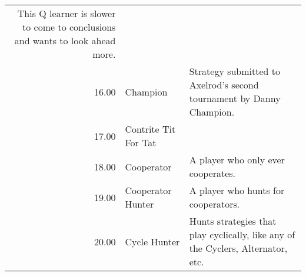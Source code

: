 \begin{table}[!hbtp]
\begin{adjustbox}{width=2\textwidth, angle=90}
\begin{tabular}{rll}
	This Q learner is slower to come to conclusions and wants to look ahead more.                                                                                                                                                                                                                                                                                                                                                                                                                                                                                                                                                                                                                                                                                                                                                                                                                                                             \\
	16.00  & Champion                    & Strategy submitted to Axelrod's second tournament by Danny Champion.                                                              \\
	17.00  & Contrite Tit For Tat        &                                                                                                                                   \\
	18.00  & Cooperator                  & A player who only ever cooperates.                                                                                                \\
	19.00  & Cooperator Hunter           & A player who hunts for cooperators.                                                                                               \\
	20.00  & Cycle Hunter                & Hunts strategies that play cyclically, like any of the Cyclers,
	                                       Alternator, etc.                                                                                                                                                                                                                                                                                                                                                                                                                                                                                                                                                                                                                                                                                                                                                                                                                                                                                                                                     \\

\end{tabular}
\end{adjustbox}
\end{table}
